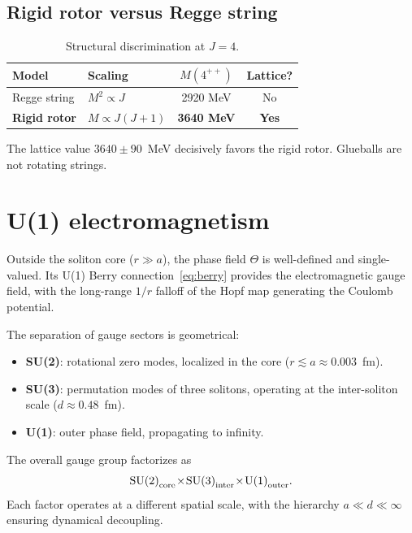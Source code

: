 \documentclass[a4paper,12pt]{article}
\begin{document}
\subsection{Rigid rotor versus Regge string}

\begin{table}[t]
\centering
\caption{Structural discrimination at $J = 4$.}
\label{tab:rotor}
\begin{tabular}{@{}llcc@{}}
\toprule
Model & Scaling & $M(4^{++})$ & Lattice? \\
\midrule
Regge string & $M^2 \propto J$ & 2920 MeV & No \\
\textbf{Rigid rotor} & $M \propto J(J+1)$ & \textbf{3640 MeV} & \textbf{Yes} \\
\bottomrule
\end{tabular}
\end{table}

The lattice value $3640 \pm 90$~MeV decisively favors the rigid
rotor. Glueballs are not rotating strings.


\section{U(1) electromagnetism}
\label{sec:u1}

Outside the soliton core ($r \gg a$), the phase field $\Theta$ is
well-defined and single-valued. Its U(1) Berry connection~\eqref{eq:berry}
provides the electromagnetic gauge field, with the long-range $1/r$
falloff of the Hopf map generating the Coulomb potential.

The separation of gauge sectors is geometrical:
\begin{itemize}
 \item \textbf{SU(2)}: rotational zero modes, localized in the core
 ($r \lesssim a \approx 0.003$~fm).
 \item \textbf{SU(3)}: permutation modes of three solitons, operating
 at the inter-soliton scale ($d \approx 0.48$~fm).
 \item \textbf{U(1)}: outer phase field, propagating to infinity.
\end{itemize}

The overall gauge group factorizes as
\begin{equation}
 \mathrm{SU(2)}_{\rm core} \!\times\!
 \mathrm{SU(3)}_{\rm inter} \!\times\!
 \mathrm{U(1)}_{\rm outer}.
\end{equation}
Each factor operates at a different spatial scale, with the hierarchy
$a \ll d \ll \infty$ ensuring dynamical decoupling.
\end{document}
